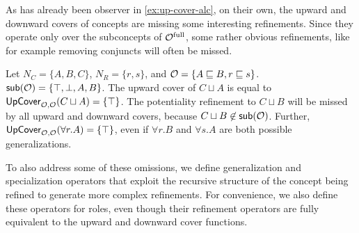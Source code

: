 As has already been observer in \cref{ex:up-cover-alc}, on their own, the upward and downward covers of concepts are missing some interesting refinements. Since they operate only over the subconcepts of ${\mathcal{O}^\textnormal{full}}$, some rather obvious refinements, like for example removing conjuncts will often be missed.
\begin{example} \label{exa:up-cover}
Let $N_C = \{A, B, C\}$, $N_R = \{ r, s \}$, and $\mathcal{O} = \{A \sqsubseteq B, r \sqsubseteq s\}$. ${\mathsf{sub}}(\mathcal{O}) = \{\top, \bot, A, B\}$. The upward cover of $C \sqcup A$ is equal to ${\mathsf{UpCover}}_{\mathcal{O},\mathcal{O}}(C \sqcup A) = \{ \top \}$. The potentiality refinement to $C \sqcup B$ will be missed by all upward and downward covers, because $C \sqcup B \not\in {\ensuremath{\mathsf{sub}}}(\mathcal{O})$. Further, ${\mathsf{UpCover}}_{\mathcal{O},\mathcal{O}}(\forall r.A) = \{ \top \}$, even if $\forall r.B$ and $\forall s.A$ are both possible generalizations.
\end{example}

To also address some of these omissions, we define generalization and specialization operators that exploit the recursive structure of the concept being refined to generate more complex refinements. For convenience, we also define these operators for roles, even though their refinement operators are fully equivalent to the upward and downward cover functions.

